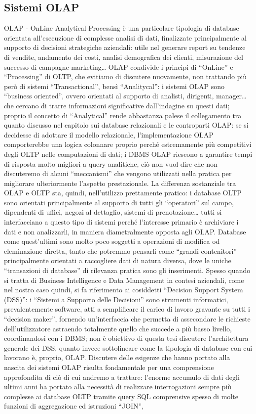 \documentclass[a4paper,12pt]{report}
\begin{document}
\subsection{Sistemi OLAP}
OLAP - OnLine Analytical Processing è una particolare tipologia di database orientata all’esecuzione di complesse analisi di dati, finalizzate principalmente al supporto di decisioni strategiche aziendali: utile nel generare report su tendenze di vendite, andamento dei costi, analisi demografica dei clienti, misurazione del successo di campagne marketing…
OLAP condivide i principi di “OnLine” e “Processing” di OLTP, che evitiamo di discutere nuovamente, non trattando più però di sistemi “Transactional”, bensì “Analitycal”: i sistemi OLAP sono “business oriented”, ovvero orientati al supporto di analisti, dirigenti, manager… che cercano di trarre informazioni significative dall’indagine su questi dati; proprio il concetto di “Analytical” rende abbastanza palese il collegamento tra quanto discusso nel capitolo sui database relazionali e le controparti OLAP: se si decidesse di adottare il modello relazionale, l’implementazione OLAP comporterebbe una logica colonnare proprio perché estremamente più competitivi degli OLTP nelle computazioni di dati; i DBMS OLAP riescono a garantire tempi di risposta molto migliori a query analitiche, ciò non vuol dire che non discuteremo di alcuni “meccanismi” che vengono utilizzati nella pratica per migliorare ulteriormente l’aspetto prestazionale. La differenza sostanziale tra OLAP e OLTP sta, quindi, nell’utilizzo prettamente pratico: i database OLTP sono orientati principalmente al supporto di tutti gli “operatori” sul campo, dipendenti di uffici, negozi al dettaglio, sistemi di prenotazione… tutti si interfacciano a questo tipo di sistemi perché l’interesse primario è archiviare i dati e non analizzarli, in maniera diametralmente opposta agli OLAP. Database come quest’ultimi sono molto poco soggetti a operazioni di modifica od eleminazione diretta, tanto che potremmo pensarli come “grandi contenitori” principalmente orientati a raccogliere dati di natura diversa, dove le uniche “transazioni di database” di rilevanza pratica sono gli inserimenti. Spesso quando si tratta di Business Intelligence e Data Management in contesi aziendali, come nel nostro caso quindi, si fa riferimento ai cosiddetti “Decision Support System (DSS)”: i  “Sistemi a Supporto delle Decisioni” sono strumenti informatici, prevalentemente software, atti a semplificare il carico di lavoro gravante su tutti i “decision maker”, fornendo un’interfaccia che permetta di assecondare le richieste dell’utilizzatore astraendo totalmente quello che succede a più basso livello, coordinandosi con i DBMS; non è obiettivo di questa tesi discutere l’architettura generale dei DSS, quanto invece sottolineare come la tipologia di database con cui lavorano è, proprio, OLAP. Discutere delle esigenze che hanno portato alla nascita dei sistemi OLAP risulta fondamentale per una comprensione approfondita di ciò di cui andremo a trattare: l’enorme accumulo di dati degli ultimi anni ha portato alla necessità di realizzare interrogazioni sempre più complesse ai database OLTP tramite query SQL comprensive spesso di molte funzioni di aggregazione ed istruzioni “JOIN”, 
\end{document}
